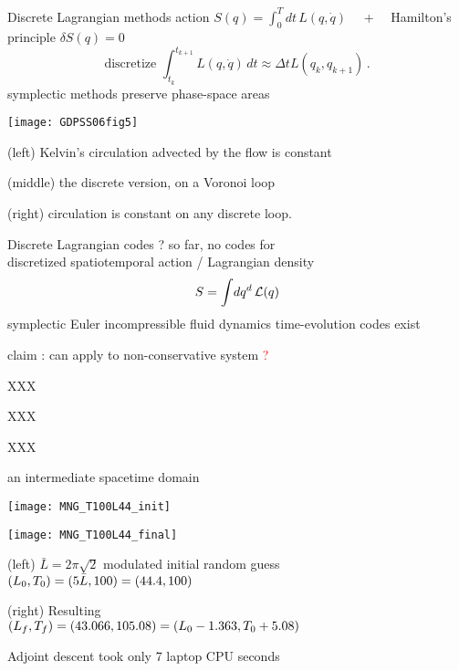 \begin{frame}{Discrete {Lagrangian} methods}
action
\(
S(q)=\int_0^T \!dt\, L(q,\dot{q})
\)
~~+~~
Hamilton’s principle
\(
\delta S(q)=0
\)
\[
\mbox{discretize  }
\int_{t_k}^{t_{k+1}} L(q,\dot{q})\,dt
    \approx
{\Delta t} L(q_k,q_{k+1})
\,.
\]
symplectic methods preserve phase-space areas

    \texttt{[image: GDPSS06fig5]}

(left) Kelvin's circulation
advected by the flow is constant

(middle) the discrete version, on a Voronoi loop

(right) circulation is constant on any discrete loop.
\end{frame}

\begin{frame}{Discrete {Lagrangian} codes ?}
so far, no codes for \\
discretized spatiotemporal action / Lagrangian density
\[
S =\int\!dq^d\, {\cal L}(q)
\]
symplectic Euler incompressible fluid dynamics
time-evolution codes exist

claim : can apply to  non-conservative system
\vfill\hfill \textcolor{red}{\NS ?}
\end{frame}


\begin{frame}{XXX}
\end{frame}

\begin{frame}{XXX}
\end{frame}

\begin{frame}{XXX}
\end{frame}

\begin{frame}{an intermediate spacetime domain}
\begin{minipage}[height=.32\textheight]{.45\textwidth}
\centering %
\texttt{[image: MNG\_T100L44\_init]}
\end{minipage}
\begin{minipage}[height=.32\textheight]{.45\textwidth}
\centering %
\texttt{[image: MNG\_T100L44\_final]}
\end{minipage}

\medskip

(left) $\bar{L}=2\pi\sqrt{2}$ modulated initial random guess
\\
$({L_{0}},{T_{0}})=(5\bar{L},100)=(44.4,100)$

\medskip

(right) Resulting \twot\ \\
$({L_{f}},{T_{f}})=(43.066,105.08) = ({L_{0}} - 1.363,{T_{0}} + 5.08)$

\vfill\hfill
Adjoint descent took only 7 laptop CPU seconds
\end{frame}

